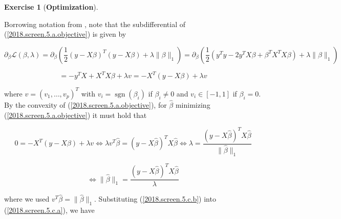 \documentclass{article}
\theoremstyle{definition}
\newtheorem{exercise}{Exercise}
\theoremstyle{definition}
\theoremstyle{definition}
\theoremstyle{definition}
\begin{document}
\begin{exercise}[\textbf{Optimization}]
\begin{enumerate}[(a)]
\begin{enumerate}[(i)]

Borrowing notation from \citet{Osborne2000}, note that the subdifferential of (\ref{2018.screen.5.a.objective}) is given by

\[
\partial_\beta \mathcal{L}(\beta, \lambda) = \partial_\beta  \left(  \frac{1}{2}(y - X \beta)^T(y - X \beta) + \lambda \lVert \beta \rVert_1\right) = \partial_\beta  \left(  \frac{1}{2}(y^Ty - 2 y^TX \beta + \beta^T X^T X \beta) + \lambda \lVert \beta \rVert_1\right) 
\]

\[
= -y^TX + X^TX \beta+ \lambda v = -X^T(y - X \beta) + \lambda v
\]

where \(v = (v_1, \dots, v_p)^T\) with \(v_i = \operatorname{sgn}(\beta_i)\) if \(\beta_i \neq 0\) and \(v_i \in [-1, 1]\) if \(\beta_i  =0\). By the convexity of (\ref{2018.screen.5.a.objective}), for \(\hat{\beta}\) minimizing (\ref{2018.screen.5.a.objective}) it must hold that 

\[
0 = -X^T(y - X \beta) + \lambda v \iff  \lambda v^T \hat{\beta} = (y - X \hat{\beta}) ^TX \hat{\beta} \iff \lambda = \frac{(y - X \hat{\beta})^TX \hat{\beta}}{\lVert \hat{\beta} \rVert_1}
\]

\begin{equation}\label{2018.screen.5.c.b}
\iff \lVert \hat{\beta} \rVert_1 = \frac{(y - X \hat{\beta})^TX \hat{\beta}}{\lambda}
\end{equation}

where we used \(v^T \hat{\beta} = \lVert \hat{\beta} \rVert_1 \). Substituting (\ref{2018.screen.5.c.b}) into (\ref{2018.screen.5.c.a}), we have
%
%
% 
% 
% 
 


\end{enumerate}
\end{enumerate}
\end{exercise}
\end{document}
